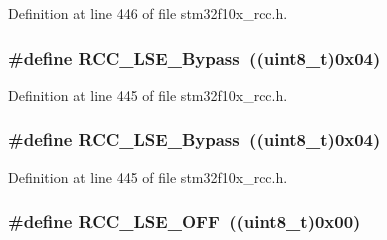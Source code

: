 Definition at line 446 of file stm32f10x\+\_\+rcc.\+h.

\subsubsection[{\texorpdfstring{R\+C\+C\+\_\+\+L\+S\+E\+\_\+\+Bypass}{RCC_LSE_Bypass}}]{\setlength{\rightskip}{0pt plus 5cm}\#define R\+C\+C\+\_\+\+L\+S\+E\+\_\+\+Bypass~(({\bf uint8\+\_\+t})0x04)}\hypertarget{group___l_s_e__configuration_gac911af00bffa1bd1b1676f582a8a88e1}{}\label{group___l_s_e__configuration_gac911af00bffa1bd1b1676f582a8a88e1}


Definition at line 445 of file stm32f10x\+\_\+rcc.\+h.

\subsubsection[{\texorpdfstring{R\+C\+C\+\_\+\+L\+S\+E\+\_\+\+Bypass}{RCC_LSE_Bypass}}]{\setlength{\rightskip}{0pt plus 5cm}\#define R\+C\+C\+\_\+\+L\+S\+E\+\_\+\+Bypass~(({\bf uint8\+\_\+t})0x04)}\hypertarget{group___l_s_e__configuration_gac911af00bffa1bd1b1676f582a8a88e1}{}\label{group___l_s_e__configuration_gac911af00bffa1bd1b1676f582a8a88e1}


Definition at line 445 of file stm32f10x\+\_\+rcc.\+h.

\subsubsection[{\texorpdfstring{R\+C\+C\+\_\+\+L\+S\+E\+\_\+\+O\+FF}{RCC_LSE_OFF}}]{\setlength{\rightskip}{0pt plus 5cm}\#define R\+C\+C\+\_\+\+L\+S\+E\+\_\+\+O\+FF~(({\bf uint8\+\_\+t})0x00)}\hypertarget{group___l_s_e__configuration_ga6645c27708d0cad1a4ab61d2abb24c77}{}\label{group___l_s_e__configuration_ga6645c27708d0cad1a4ab61d2abb24c77}


